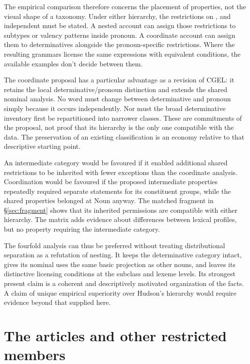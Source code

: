 \documentclass[12pt]{article}
\begin{document}
The empirical comparison therefore concerns the placement of properties, not the visual shape of a taxonomy. Under either hierarchy, the restrictions on ,  and independent  must be stated. A nested account can assign those restrictions to subtypes or valency patterns inside pronoun. A coordinate account can assign them to determinatives alongside the pronoun-specific restrictions. Where the resulting grammars license the same expressions with equivalent conditions, the available examples don't decide between them.

The coordinate proposal has a particular advantage as a revision of CGEL: it retains the local determinative/pronoun distinction and extends the shared nominal analysis. No word must change between determinative and pronoun simply because it occurs independently. Nor must the broad determinative inventory first be repartitioned into narrower classes. These are commitments of the proposal, not proof that its hierarchy is the only one compatible with the data. The preservation of an existing classification is an economy relative to that descriptive starting point.

An intermediate category would be favoured if it enabled additional shared restrictions to be inherited with fewer exceptions than the coordinate analysis. Coordination would be favoured if the proposed intermediate properties repeatedly required separate statements for its constituent groups, while the shared properties belonged at Noun anyway. The matched fragment in §\ref{sec:fragment} shows that its inherited permissions are compatible with either hierarchy. The matrix adds evidence about differences between lexical profiles, but no property requiring the intermediate category.

The fourfold analysis can thus be preferred without treating distributional separation as a refutation of nesting. It keeps the determinative category intact, gives its nominal uses the same basic projection as other nouns, and leaves its distinctive licensing conditions at the subclass and lexeme levels. Its strongest present claim is a coherent and descriptively motivated organization of the facts. A claim of unique empirical superiority over Hudson's hierarchy would require evidence beyond that supplied here.

\section{The articles and other restricted members}\label{sec:articles}
\end{document}
